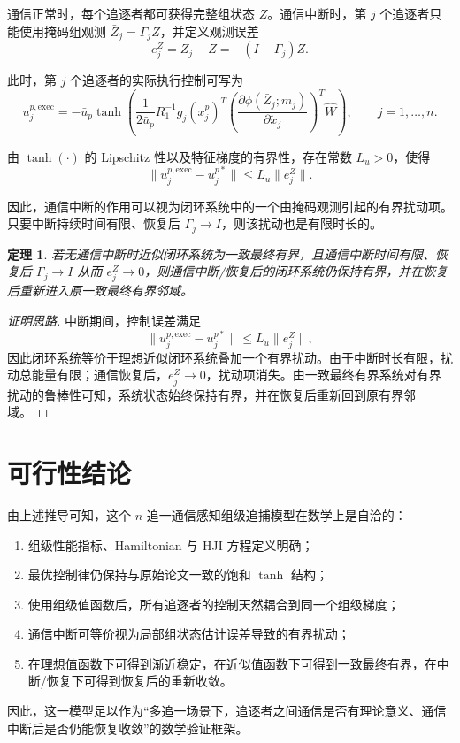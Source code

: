 ﻿\documentclass[12pt,a4paper]{ctexart}
\newtheorem{theorem}{定理}
\begin{document}
通信正常时，每个追逐者都可获得完整组状态 $Z$。通信中断时，第 $j$ 个追逐者只能使用掩码组观测 $\bar Z_j=\Gamma_j Z$，并定义观测误差
\begin{equation}
    e_j^Z = \bar Z_j - Z = -(I-\Gamma_j)Z.
\end{equation}

此时，第 $j$ 个追逐者的实际执行控制可写为
\begin{equation}
    u_j^{p,\mathrm{exec}}
    =
    -\bar u_p
    \tanh\!\left(
    \frac{1}{2\bar u_p}
    R_1^{-1}
    g_j(x_j^p)^T
    \left(\frac{\partial \phi(\bar Z_j;m_j)}{\partial \tilde x_j}\right)^T\hat W
    \right),
    \qquad j=1,\dots,n.
\end{equation}

由 $\tanh(\cdot)$ 的 Lipschitz 性以及特征梯度的有界性，存在常数 $L_u>0$，使得
\begin{equation}
    \|u_j^{p,\mathrm{exec}}-u_j^{p*}\|
    \le
    L_u\|e_j^Z\|.
\end{equation}

因此，通信中断的作用可以视为闭环系统中的一个由掩码观测引起的有界扰动项。只要中断持续时间有限、恢复后 $\Gamma_j\to I$，则该扰动也是有限时长的。

\begin{theorem}
若无通信中断时近似闭环系统为一致最终有界，且通信中断时间有限、恢复后 $\Gamma_j\to I$ 从而 $e_j^Z\to 0$，则通信中断/恢复后的闭环系统仍保持有界，并在恢复后重新进入原一致最终有界邻域。
\end{theorem}

\begin{proof}[证明思路]
中断期间，控制误差满足
\[
\|u_j^{p,\mathrm{exec}}-u_j^{p*}\|\le L_u\|e_j^Z\|,
\]
因此闭环系统等价于理想近似闭环系统叠加一个有界扰动。由于中断时长有限，扰动总能量有限；通信恢复后，$e_j^Z\to 0$，扰动项消失。由一致最终有界系统对有界扰动的鲁棒性可知，系统状态始终保持有界，并在恢复后重新回到原有界邻域。
\end{proof}

\section{可行性结论}

由上述推导可知，这个 $n$ 追一通信感知组级追捕模型在数学上是自洽的：
\begin{enumerate}[label=\arabic*)]
    \item 组级性能指标、Hamiltonian 与 HJI 方程定义明确；
    \item 最优控制律仍保持与原始论文一致的饱和 $\tanh$ 结构；
    \item 使用组级值函数后，所有追逐者的控制天然耦合到同一个组级梯度；
    \item 通信中断可等价视为局部组状态估计误差导致的有界扰动；
    \item 在理想值函数下可得到渐近稳定，在近似值函数下可得到一致最终有界，在中断/恢复下可得到恢复后的重新收敛。
\end{enumerate}

因此，这一模型足以作为“多追一场景下，追逐者之间通信是否有理论意义、通信中断后是否仍能恢复收敛”的数学验证框架。
\end{document}
